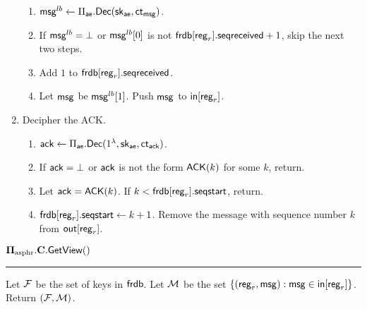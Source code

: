 \begin{definition}
\begin{enumerate}
\begin{enumerate}
        \item $\mathsf{msg}^{lb} \leftarrow \Pi_{\mathsf{ae}}.\mathsf{Dec}({\mathsf{sk}}_{\mathsf{ae}}, \mathsf{ct}_{\mathsf{msg}})$.
        \item If $\mathsf{msg}^{lb} = \bot$ or $\mathsf{msg}^{lb}[0]$ is not $\mathsf{frdb}[\mathsf{reg}_r].\mathsf{seqreceived} + 1$, skip the next two steps.
        \item Add $1$ to $\mathsf{frdb}[\mathsf{reg}_r].\mathsf{seqreceived}$. 
        \item Let $\mathsf{msg}$ be $\mathsf{msg}^{lb}[1]$. Push $\mathsf{msg}$ to $\mathsf{in}[\mathsf{reg}_r]$.
    \end{enumerate}
    \item Decipher the ACK.
    \begin{enumerate}
        \item $\mathsf{ack} \leftarrow \Pi_{\mathsf{ae}}.\mathsf{Dec}(1^{\lambda}, {\mathsf{sk}}_{\mathsf{ae}}, \mathsf{ct}_{\mathsf{ack}})$.
        \item If $\mathsf{ack} = \bot$ or $\mathsf{ack}$ is not the form $\mathsf{ACK}(k)$ for some $k$, return.
        \item Let $\mathsf{ack} = \mathsf{ACK}(k)$. If $k < \mathsf{frdb}[\mathsf{reg}_r].\mathsf{seqstart}$, return.
        \item $\mathsf{frdb}[\mathsf{reg}_r].\mathsf{seqstart} \leftarrow k + 1$. Remove the message with sequence number $k$ from $\mathsf{out}[\mathsf{reg}_r]$.
    \end{enumerate}
\end{enumerate}
\vspace{10pt}
$\mathbf{\Pi_{\text{asphr}}.C.\mathsf{GetView}}()$
\vspace{5pt}
\hrule
\vspace{5pt}
Let $\mathcal{F}$ be the set of keys in $\mathsf{frdb}$. Let $\mathcal{M}$ be the set $\{(\mathsf{reg}_r, \mathsf{msg}): \mathsf{msg} \in \mathsf{in}[\mathsf{reg}_r]\}$. Return $(\mathcal{F}, \mathcal{M})$.

\end{definition}